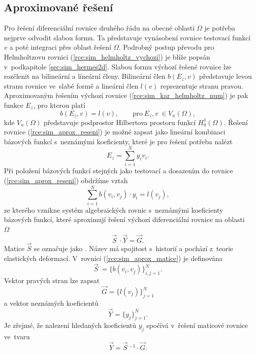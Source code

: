 \subsection{Aproximované řešení}
Pro řešení diferenciální rovnice druhého řádu na obecné oblasti $\Omega$ je potřeba nejprve odvodit slabou formu. Ta představuje vynásobení rovnice testovací funkcí $v$ a poté integraci přes oblast řešení $\Omega$. Podrobný postup převodu pro Helmholtzovu rovnici (\ref{rce:sim_helmholtz_vychozi}) je blíže popsán v~podkapitole \ref{sec:sim_hermes2d}. Slabou formu výchozí řešené rovnice lze rozčlenit na bilineární a lineární členy. Bilineární člen $b(E_z,v)$ představuje levou stranu rovnice ve~slabé formě a lineární člen $l(v)$ reprezentuje stranu pravou.
Aproximovaným řešením výchozí rovnice (\ref{rce:sim_kar_helmholtz_num}) je pak funkce $E_z$, pro kterou platí 
\begin{equation}
	b(E_z,v) = l(v),\qquad \mathrm{pro}\ E_z, v~\in V_{n}(\Omega),
	\label{rce:sim_aprox_reseni}
\end{equation}
kde $V_{n}(\Omega)$ představuje podprostor Hilbertova prostoru funkcí $H_{0}^{1}(\Omega)$. Řešení rovnice (\ref{rce:sim_aprox_reseni}) je možné zapsat jako lineární kombinaci bázových funkcí s~neznámými koeficienty, které je pro řešení potřeba nalézt
\begin{displaymath}
	E_z = \sum_{i=1}^{N}y_i v_i.
\end{displaymath}
Při položení bázových funkcí stejných jako testovací a dosazením do rovnice  (\ref{rce:sim_aprox_reseni}) obdržíme vztah
\begin{equation}
	\sum_{i=1}^{N}b(v_i,v_j)\cdot y_i = l(v_j),
	\label{rce:sim_aprox_reseni2}
\end{equation}
ze kterého vznikne systém algebraických rovnic s~neznámými koeficienty bázových funkcí, které aproximují řešení výchozí diferenciální rovnice na oblasti $\Omega$
\begin{equation}
	\vec S~\cdot \vec Y = \vec G.
	\label{rce:sim_aprox_matice}
\end{equation}
Matice $\vec S$ se označuje jako . Název má spojitost s~historií a pochází z~teorie elastických deformací. V~rovnici (\ref{rce:sim_aprox_matice}) je definována
\begin{displaymath}
	\vec S~= \{b(v_i,v_j) \}_{i,j = 1}^{N}.
\end{displaymath}
Vektor pravých stran lze zapsat
\begin{displaymath}
	\vec G = \{l(v_j) \}_{j = 1}^{N}
\end{displaymath}
a vektor neznámých koeficientů
\begin{displaymath}
	\vec Y = \{y_j \}_{j = 1}^{N}.
\end{displaymath}
Je zřejmé, že nalezení hledaných koeficientů $y_j$ spočívá v~řešení maticové rovnice ve~tvaru
\begin{equation}
	\vec Y = \vec S~^{-1}\cdot \vec G.
	\label{rce:sim_aprox_inv_matice}
\end{equation}

